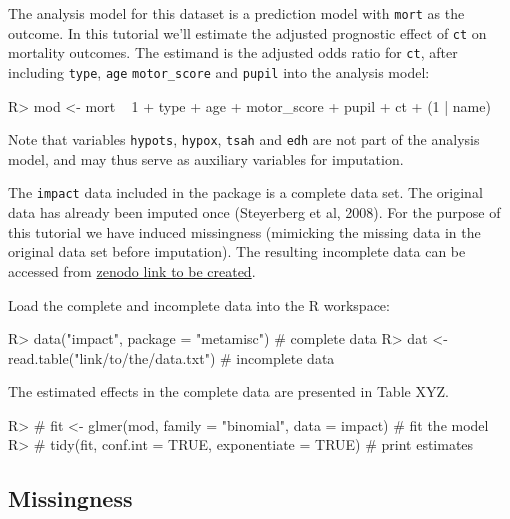 \documentclass[
]{jss}
\begin{document}
The analysis model for this dataset is a prediction model with
\texttt{mort} as the outcome. In this tutorial we'll estimate the
adjusted prognostic effect of \texttt{ct} on mortality outcomes. The
estimand is the adjusted odds ratio for \texttt{ct}, after including
\texttt{type}, \texttt{age} \texttt{motor\_score} and \texttt{pupil}
into the analysis model:

\begin{CodeChunk}
\begin{CodeInput}
R> mod <- mort ~ 1 + type + age + motor_score + pupil + ct + (1 | name) 
\end{CodeInput}
\end{CodeChunk}

Note that variables \texttt{hypots}, \texttt{hypox}, \texttt{tsah} and
\texttt{edh} are not part of the analysis model, and may thus serve as
auxiliary variables for imputation.

The \texttt{impact} data included in the  package is a
complete data set. The original data has already been imputed once
(Steyerberg et al, 2008). For the purpose of this tutorial we have
induced missingness (mimicking the missing data in the original data set
before imputation). The resulting incomplete data can be accessed from
\href{https://zenodo.com}{zenodo link to be created}.

Load the complete and incomplete data into the R workspace:

\begin{CodeChunk}
\begin{CodeInput}
R> data("impact", package = "metamisc")      # complete data
R> dat <- read.table("link/to/the/data.txt") # incomplete data
\end{CodeInput}
\end{CodeChunk}

The estimated effects in the complete data are presented in Table XYZ.

\begin{CodeChunk}
\begin{CodeInput}
R> # fit <- glmer(mod, family = "binomial", data = impact) # fit the model
R> # tidy(fit, conf.int = TRUE, exponentiate = TRUE)       # print estimates
\end{CodeInput}
\end{CodeChunk}

\hypertarget{missingness}{%
\subsection{Missingness}\label{missingness}}
\end{document}
